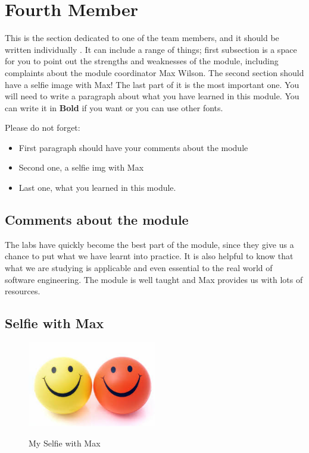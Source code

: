 \section{Fourth Member}
This is the section dedicated to one of the team members, and it should be written individually . It can include a range of things; first subsection is a space for you to point out the strengths and weaknesses of the module, including complaints about the module coordinator Max Wilson. The second section should have a selfie image with Max! The last part of it is the most important one. You will need to write a paragraph about what you have learned in this module. You can write it in \textbf{Bold} if you want or you can use other fonts. 

Please do not forget:
\begin{itemize}
	\item First paragraph should have your comments about the module
	\item Second one, a selfie img with Max
	\item Last one, what you learned in this module.
\end{itemize}

\subsection{Comments about the module}
The labs have quickly become the best part of the module, since they give us a chance to put what we have learnt into practice. It is also helpful to know that what we are studying is applicable and even essential to the real world of software engineering. 
The module is well taught and Max provides us with lots of resources.

\subsection{Selfie with Max}


\begin{figure}[h]
\caption{My Selfie with Max}
\centering
\includegraphics[width=0.5\textwidth]{Smiley-Faces.jpg}
\label{fig:selfie}
\end{figure}

